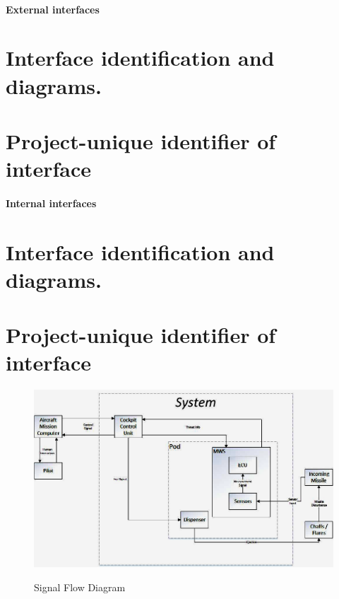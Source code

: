 \subsubsection{External interfaces}
\chapter{Interface identification and diagrams.}
\chapter{Project-unique identifier of interface}
\subsubsection{Internal interfaces}
\chapter{Interface identification and diagrams.}
\chapter{Project-unique identifier of interface}
\begin{figure}[h]
	\centering
	\includegraphics[scale=0.5]{./images/SignalFlowDiagram}\\
	\caption{Signal Flow Diagram}
    \label{fig:sigFlowDiagram}
\end{figure}
